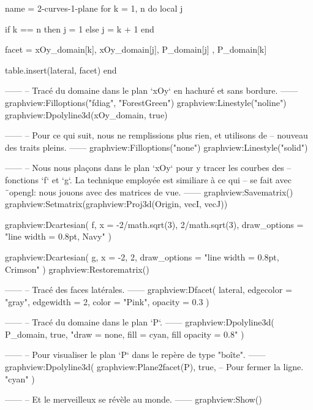 \documentclass[border = 3pt]{standalone}
\begin{document}
\begin{luadraw}{name = 2-curves-1-plane}
    for k = 1, n do
        local j

        if k == n then
            j = 1
        else
            j = k + 1
        end

        facet = {
            xOy_domain[k], xOy_domain[j],
            P_domain[j]  , P_domain[k]
        }

        table.insert(lateral, facet)
    end

------
-- Tracé du domaine dans le plan `xOy` en hachuré et sans bordure.
------
    graphview:Filloptions("fdiag", "ForestGreen")
    graphview:Linestyle("noline")
    graphview:Dpolyline3d(xOy_domain, true)

------
-- Pour ce qui suit, nous ne remplissions plus rien, et utilisons de
-- nouveau des traits pleins.
------
    graphview:Filloptions("none")
    graphview:Linestyle("solid")

------
-- Nous nous plaçons dans le plan `xOy` pour y tracer les courbes des
-- fonctions  `f` et `g`. La technique employée est similiare à ce qui
-- se fait avec ¨opengl: nous jouons avec des matrices de vue.
------
    graphview:Savematrix()
        graphview:Setmatrix(graphview:Proj3d({Origin, vecI, vecJ}))

        graphview:Dcartesian(
            f,
            {x = {-2/math.sqrt(3), 2/math.sqrt(3)},
            draw_options = "line width = 0.8pt, Navy"
        })

        graphview:Dcartesian(
            g,
            {x = {-2, 2},
            draw_options = "line width = 0.8pt, Crimson"
        })
    graphview:Restorematrix()

------
-- Tracé des faces latérales.
------
    graphview:Dfacet(
        lateral,
        {
            edgecolor = "gray",
            edgewidth = 2,
            color     = "Pink",
            opacity   = 0.3
        })

------
-- Tracé du domaine dans le plan `P`.
------
    graphview:Dpolyline3d(
        P_domain,
        true,
        "draw = none, fill = cyan, fill opacity = 0.8"
    )

------
-- Pour visualiser le plan `P` dans le repère de type "boîte".
------
    graphview:Dpolyline3d(
        graphview:Plane2facet(P),
        true,   -- Pour fermer la ligne.
        "cyan"
     )

------
-- Et le merveilleux se révèle au monde.
------
    graphview:Show()
\end{luadraw}
\end{document}
